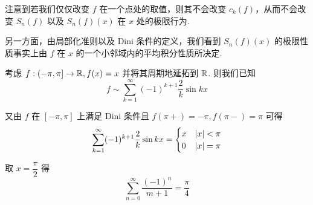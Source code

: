 \begin{hint}
    注意到若我们仅仅改变 $f$ 在一个点处的取值，则其不会改变 $c_k(f)$，从而不会改变 $S_n(f)$ 以及 $S_n(f)(x)$ 在 $x$ 处的极限行为.

    另一方面，由局部化准则以及 Dini 条件的定义，我们看到 $S_n(f)(x)$ 的极限性质事实上由 $f$ 在 $x$ 的一个小邻域内的平均积分性质所决定.
\end{hint}

\begin{example}
    考虑 $f:(-\pi,\pi]\to\mathbb{R},f(x)=x$ 并将其周期地延拓到 $\mathbb{R}$. 则我们已知
$$
f\sim\sum_{k=1}^\infty(-1)^{k+1}\frac{2}{k}\sin kx
$$

    又由 $f$ 在 $[-\pi,\pi]$ 上满足 Dini 条件且 $f(\pi+)=-\pi,f(\pi-)=\pi$ 可得
$$
\sum_{k=1}^\infty(-1)^{k+1}\frac{2}{k}\sin kx=\begin{cases}
    x & \left\lvert{x}\right\rvert<\pi\\
    0 & \left\lvert{x}\right\rvert=\pi
\end{cases}
$$

    取 $x=\dfrac{\pi}{2}$ 得
$$
\sum_{n=0}^\infty\frac{(-1)^n}{m+1}=\frac{\pi}{4}
$$
\end{example}

\begin{center}
\end{center}

